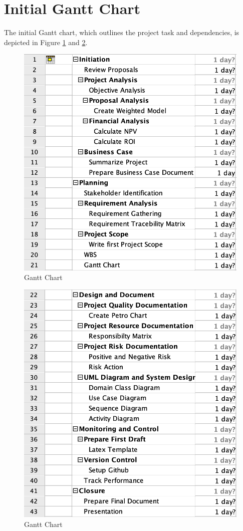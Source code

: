 \section{Initial Gantt Chart}

The initial Gantt chart, which outlines the project task and dependencies, is depicted in Figure \ref{fig:gnt1} and \ref{fig:gnt2}.

\begin{figure}[ht]
    \includegraphics[width=\textwidth]{images/gantt_2.png}
    \caption{Gantt Chart}
    \label{fig:gnt1}
\end{figure}

\begin{figure}[ht]
    \includegraphics[width=\textwidth]{images/gantt_1.png}
    \caption{Gantt Chart}
    \label{fig:gnt2}
\end{figure}

\FloatBarrier
\newpage